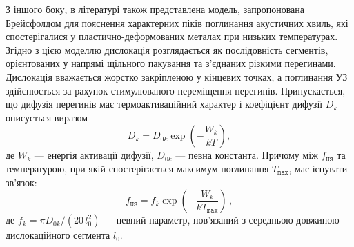 З іншого боку, в літературі \cite{Brailsford} також представлена модель, запропонована Брейсфолдом для пояснення характерних піків поглинання акустичних хвиль, які спостерігалися у пластично-деформованих металах при низьких температурах.
Згідно з цією моделлю дислокація розглядається як послідовність сегментів, орієнтованих у напрямі щільного пакування та з'єднаних різкими перегинами.
Дислокація вважається жорстко закріпленою у кінцевих точках, а поглинання УЗ здійснюється за рахунок стимулюваного переміщення перегинів.
Припускається, що дифузія перегинів має термоактиваційний характер і коефіцієнт дифузії $D_k$ описується виразом
\begin{equation}\label{eqDkink}
  D_k = D_{0k} \exp\left(-\frac{W_k}{kT}\right),
\end{equation}
де $W_k$ --- енергія активації дифузії,
$D_{0k}$ --- певна константа.
Причому між $f_\mathtt{US}$ та температурою, при якій спостерігається максимум поглинання $T_\mathtt{max}$, має існувати зв'язок:
\begin{equation}
\label{eqfk}
f_\mathtt{US}=f_k\exp\left(-\frac{W_k}{kT_\mathtt{max}}\right)\,,
\end{equation}
де
$f_k=\pi D_{0k}/(20 \,l_0^2)$ --- певний параметр, пов'язаний з середньою довжиною дислокаційного сегмента $l_0$.

